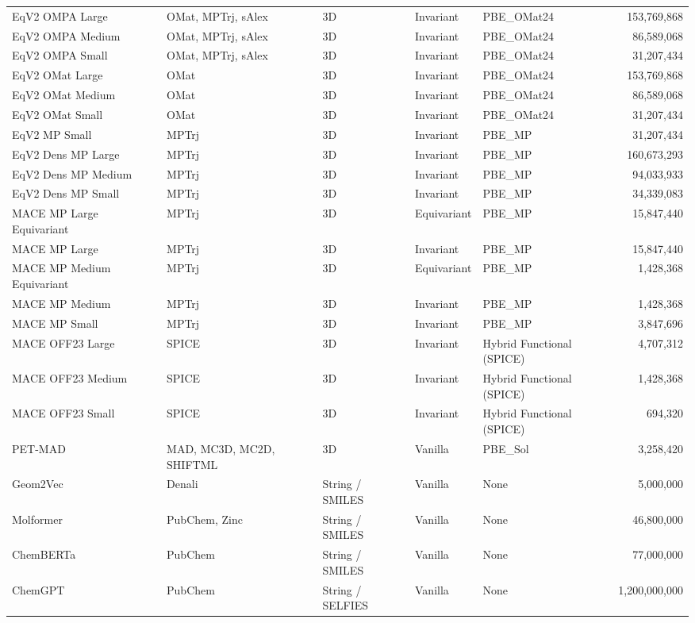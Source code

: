 \documentclass[11pt]{article}
\begin{document}
\begin{table}[htbp]
{\begin{tabular}{l l l l l r}
EqV2 OMPA Large & OMat, MPTrj, sAlex & 3D & Invariant & PBE\_OMat24 & 153,769,868 \\
EqV2 OMPA Medium & OMat, MPTrj, sAlex & 3D & Invariant & PBE\_OMat24 & 86,589,068 \\
EqV2 OMPA Small & OMat, MPTrj, sAlex & 3D & Invariant & PBE\_OMat24 & 31,207,434 \\
EqV2 OMat Large & OMat & 3D & Invariant & PBE\_OMat24 & 153,769,868 \\
EqV2 OMat Medium & OMat & 3D & Invariant & PBE\_OMat24 & 86,589,068 \\
EqV2 OMat Small & OMat & 3D & Invariant & PBE\_OMat24 & 31,207,434 \\
EqV2 MP Small & MPTrj & 3D & Invariant & PBE\_MP & 31,207,434 \\
EqV2 Dens MP Large & MPTrj & 3D & Invariant & PBE\_MP & 160,673,293 \\
EqV2 Dens MP Medium & MPTrj & 3D & Invariant & PBE\_MP & 94,033,933 \\
EqV2 Dens MP Small & MPTrj & 3D & Invariant & PBE\_MP & 34,339,083 \\
MACE MP Large Equivariant & MPTrj & 3D & Equivariant & PBE\_MP & 15,847,440 \\
MACE MP Large & MPTrj & 3D & Invariant & PBE\_MP & 15,847,440 \\
MACE MP Medium Equivariant & MPTrj & 3D & Equivariant & PBE\_MP & 1,428,368 \\
MACE MP Medium & MPTrj & 3D & Invariant & PBE\_MP & 1,428,368 \\
MACE MP Small & MPTrj & 3D & Invariant & PBE\_MP & 3,847,696 \\
MACE OFF23 Large & SPICE & 3D & Invariant & Hybrid Functional (SPICE) & 4,707,312 \\
MACE OFF23 Medium & SPICE & 3D & Invariant & Hybrid Functional (SPICE) & 1,428,368 \\
MACE OFF23 Small & SPICE & 3D & Invariant & Hybrid Functional (SPICE) & 694,320 \\
PET-MAD & MAD, MC3D, MC2D, SHIFTML & 3D & Vanilla & PBE\_Sol & 3,258,420 \\
Geom2Vec & Denali & String / SMILES & Vanilla & None & 5,000,000 \\
Molformer & PubChem, Zinc & String / SMILES & Vanilla & None & 46,800,000 \\
ChemBERTa & PubChem & String / SMILES & Vanilla & None & 77,000,000 \\
ChemGPT & PubChem & String / SELFIES & Vanilla & None & 1,200,000,000 \\

\end{tabular}}
\end{table}
\end{document}
